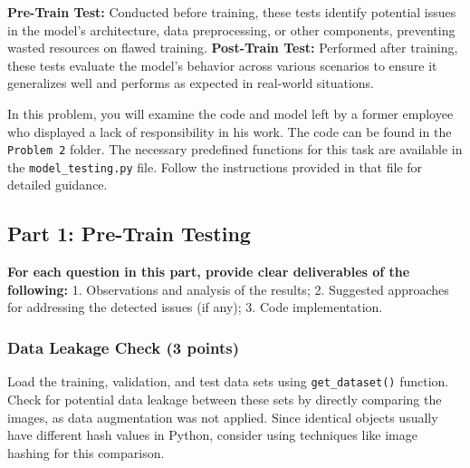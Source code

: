 \documentclass[11pt, oneside]{article}   	%
\begin{document}
\noindent \textbf{Pre-Train Test:} Conducted before training, these tests identify potential issues in the model's architecture, data preprocessing, or other components, preventing wasted resources on flawed training.
 \textbf{Post-Train Test:} Performed after training, these tests evaluate the model's behavior across various scenarios to ensure it generalizes well and performs as expected in real-world situations.

In this problem, you will examine the code and model left by a former employee who displayed a lack of responsibility in his work. The code can be found in the \texttt{Problem 2} folder. The necessary predefined functions for this task are available in the \texttt{model\_testing.py} file. Follow the instructions provided in that file for detailed guidance.

\subsection*{Part 1: Pre-Train Testing}

\textbf{For each question in this part, provide clear deliverables of the following:} 1. Observations and analysis of the results; 2. Suggested approaches for addressing the detected issues (if any); 3. Code implementation.

\subsubsection*{Data Leakage Check (3 points)}
Load the training, validation, and test data sets using \texttt{get\_dataset()} function. Check for potential data leakage between these sets by directly comparing the images, as data augmentation was not applied. Since identical objects usually have different hash values in Python, consider using techniques like image hashing for this comparison.
\end{document}

